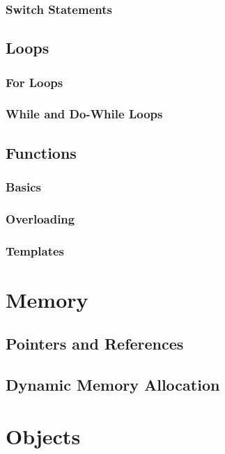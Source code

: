 \documentclass[11pt,fancy,authoryear]{elegantbook}
\begin{document}
\subsection{Switch Statements}

\section{Loops}

\subsection{For Loops}

\subsection{While and Do-While Loops}

\section{Functions}

\subsection{Basics}

\subsection{Overloading}

\subsection{Templates}

\chapter{Memory}

\section{Pointers and References}

\section{Dynamic Memory Allocation}

\chapter{Objects}
\end{document}
